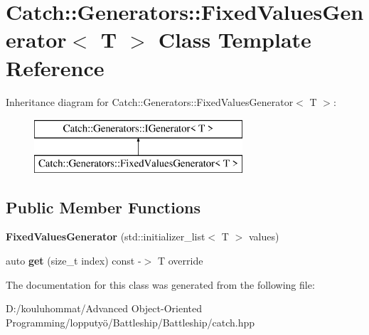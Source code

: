 \hypertarget{class_catch_1_1_generators_1_1_fixed_values_generator}{}\section{Catch\+:\+:Generators\+:\+:Fixed\+Values\+Generator$<$ T $>$ Class Template Reference}
\label{class_catch_1_1_generators_1_1_fixed_values_generator}
Inheritance diagram for Catch\+:\+:Generators\+:\+:Fixed\+Values\+Generator$<$ T $>$\+:\begin{figure}[H]
\begin{center}
\leavevmode
\includegraphics[height=2.000000cm]{class_catch_1_1_generators_1_1_fixed_values_generator}
\end{center}
\end{figure}
\subsection*{Public Member Functions}
\begin{DoxyCompactItemize}
\item 
\mbox{\label{class_catch_1_1_generators_1_1_fixed_values_generator_a6e9f473655413c1cb15f079890f06b86}} 
{\bfseries Fixed\+Values\+Generator} (std\+::initializer\+\_\+list$<$ T $>$ values)
\item 
\mbox{\label{class_catch_1_1_generators_1_1_fixed_values_generator_a3ed654a5860c170dbe7b01487b83253d}} 
auto {\bfseries get} (size\+\_\+t index) const -\/$>$ T override
\end{DoxyCompactItemize}


The documentation for this class was generated from the following file\+:\begin{DoxyCompactItemize}
\item 
D\+:/kouluhommat/\+Advanced Object-\/\+Oriented Programming/lopputyö/\+Battleship/\+Battleship/catch.\+hpp\end{DoxyCompactItemize}
